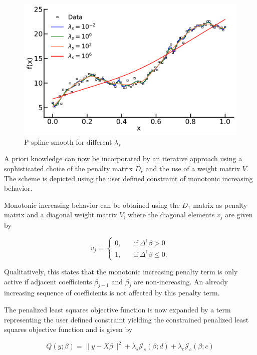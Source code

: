 \documentclass[10pt,a4paper]{article}
\begin{document}
	
	\begin{figure}[H]
		\centering
		\includegraphics[width=\linewidth]{thesisplots/p_splines.pdf}
		\caption{P-spline smooth for different $\lambda_s$}
		\label{fig:pspline}
	\end{figure}
			
	A priori knowledge can now be incorporated by an iterative approach using a sophisticated choice of the penalty matrix $D_c$ and the use of a weight matrix $V$. The scheme is depicted using the user defined constraint of monotonic increasing behavior.  
	
	Monotonic increasing behavior can be obtained using the $D_1$ matrix as penalty matrix and a diagonal weight matrix $V$, where the diagonal elements $v_j$ are given by
	
	$$v_j = \begin{cases} 0, & \quad \text{if} \ \Delta^1 \beta > 0 \\ 
						  1, & \quad \text{if} \ \Delta^1 \beta \le 0.
		 	\end{cases}$$
	
	Qualitatively, this states that the monotonic increasing penalty term is only active if adjacent coefficients $\beta_{j-1}$ and $\beta_j$ are non-increasing. An already increasing sequence of coefficients is not affected by this penalty term. \cite{hofner2011monotonicity}
	
	The penalized least squares objective function is now expanded by a term representing the user defined constraint yielding the constrained penalized least squares objective function and is given by
	
	\begin{equation} \label{PLSc}
	    Q(y; \beta) = \lVert y - X\beta \rVert^2 + \lambda_s \mathcal J_s(\beta; d) + \lambda_c \mathcal J_c(\beta; c)
	\end{equation}
	
\end{document}
